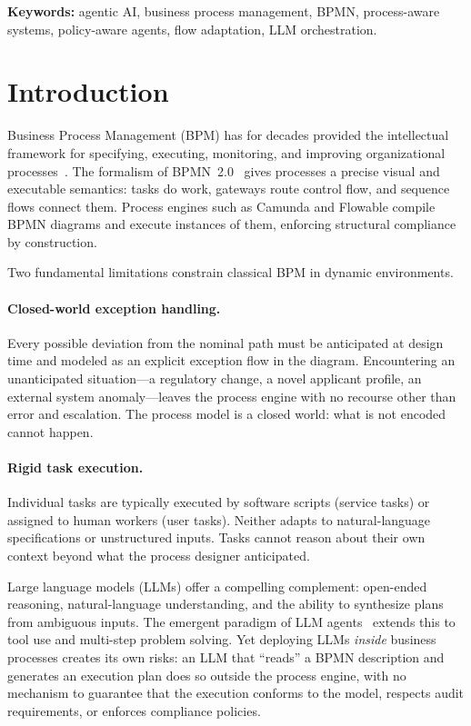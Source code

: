 \documentclass[11pt,a4paper]{article}
\begin{document}
\smallskip
\noindent\textbf{Keywords:} agentic AI, business process management, BPMN,
process-aware systems, policy-aware agents, flow adaptation, LLM orchestration.

\section{Introduction}
\label{sec:intro}

Business Process Management (BPM) has for decades provided the intellectual
framework for specifying, executing, monitoring, and improving organizational
processes~\cite{vdaalst2016processm}. The formalism of BPMN~2.0~\cite{bpmn2011}
gives processes a precise visual and executable semantics: tasks do work, gateways
route control flow, and sequence flows connect them. Process engines such as
Camunda and Flowable compile BPMN diagrams and execute instances of them,
enforcing structural compliance by construction.

Two fundamental limitations constrain classical BPM in dynamic environments.

\paragraph{Closed-world exception handling.}
Every possible deviation from the nominal path must be anticipated at design time
and modeled as an explicit exception flow in the diagram. Encountering an
unanticipated situation---a regulatory change, a novel applicant profile, an
external system anomaly---leaves the process engine with no recourse other than
error and escalation. The process model is a closed world: what is not encoded
cannot happen.

\paragraph{Rigid task execution.}
Individual tasks are typically executed by software scripts (service tasks) or
assigned to human workers (user tasks). Neither adapts to natural-language
specifications or unstructured inputs. Tasks cannot reason about their own
context beyond what the process designer anticipated.

Large language models (LLMs) offer a compelling complement: open-ended reasoning,
natural-language understanding, and the ability to synthesize plans from ambiguous
inputs. The emergent paradigm of LLM agents~\cite{yao2022react,wang2024survey}
extends this to tool use and multi-step problem solving. Yet deploying LLMs
\emph{inside} business processes creates its own risks: an LLM that ``reads'' a
BPMN description and generates an execution plan does so outside the process
engine, with no mechanism to guarantee that the execution conforms to the model,
respects audit requirements, or enforces compliance policies.
\end{document}
